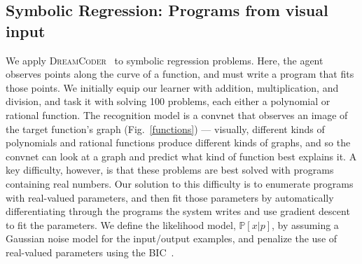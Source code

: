 \documentclass{article}
\newcommand{\system}{\textsc{DreamCoder}~}
\newcommand{\probability}{\mathds{P}} %
\begin{document}
\subsection{Symbolic Regression: Programs from visual input}\label{regressionSection}
We apply \system
to symbolic regression problems.  Here, the
agent observes points along the curve of a function, and must write a
program that fits those points.  We initially equip our learner with
addition, multiplication, and division, and task it with solving
100 %
problems, each either a polynomial or rational function.  The recognition model is a
convnet that observes an image of the target function's
graph (Fig.~\ref{functions}) --- visually, different kinds of
polynomials and rational functions produce different kinds of graphs,
and so the convnet can  look at a graph and predict
what kind of function best explains it.
A key difficulty, however, is
that these problems are best solved with programs containing real
numbers.  Our solution to this difficulty is to enumerate
 programs with real-valued parameters, and then fit those
parameters by automatically differentiating through the programs the
system writes and use gradient descent to fit the parameters.
We define the likelihood model, $\probability[x|p]$, by assuming a Gaussian noise model for the input/output examples,
and penalize the use of real-valued parameters using the BIC~\cite{Bishop:2006:PRM:1162264}.
\end{document}
